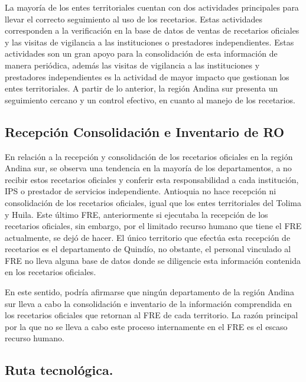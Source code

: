 \documentclass[
]{book}
\begin{document}
La mayoría de los entes territoriales cuentan con dos actividades principales para llevar el correcto seguimiento al uso de los recetarios. Estas actividades corresponden a la verificación en la base de datos de ventas de recetarios oficiales y las visitas de vigilancia a las instituciones o prestadores independientes. Estas actividades son un gran apoyo para la consolidación de esta información de manera periódica, además las visitas de vigilancia a las instituciones y prestadores independientes es la actividad de mayor impacto que gestionan los entes territoriales. A partir de lo anterior, la región Andina sur presenta un seguimiento cercano y un control efectivo, en cuanto al manejo de los recetarios.

\hypertarget{recepciuxf3n-consolidaciuxf3n-e-inventario-de-ro-1}{%
\subsection{Recepción Consolidación e Inventario de RO}\label{recepciuxf3n-consolidaciuxf3n-e-inventario-de-ro-1}}

En relación a la recepción y consolidación de los recetarios oficiales en la región Andina sur, se observa una tendencia en la mayoría de los departamentos, a no recibir estos recetarios oficiales y conferir esta responsabilidad a cada institución, IPS o prestador de servicios independiente. Antioquia no hace recepción ni consolidación de los recetarios oficiales, igual que los entes territoriales del Tolima y Huila. Este último FRE, anteriormente si ejecutaba la recepción de los recetarios oficiales, sin embargo, por el limitado recurso humano que tiene el FRE actualmente, se dejó de hacer. El único territorio que efectúa esta recepción de recetarios es el departamento de Quindío, no obstante, el personal vinculado al FRE no lleva alguna base de datos donde se diligencie esta información contenida en los recetarios oficiales.

En este sentido, podría afirmarse que ningún departamento de la región Andina sur lleva a cabo la consolidación e inventario de la información comprendida en los recetarios oficiales que retornan al FRE de cada territorio. La razón principal por la que no se lleva a cabo este proceso internamente en el FRE es el escaso recurso humano.

\hypertarget{ruta-tecnoluxf3gica.-1}{%
\subsection{Ruta tecnológica.}\label{ruta-tecnoluxf3gica.-1}}
\end{document}
